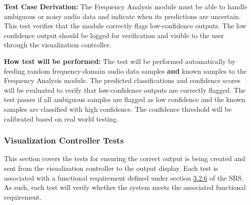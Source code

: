 \documentclass[12pt, titlepage]{article}
\begin{document}
\begin{enumerate}
\textbf{Test Case Derivation:}
The Frequency Analysis module must be able to handle ambiguous or noisy audio
data and indicate when its predictions are uncertain. This test verifies that
the module correctly flags low-confidence outputs. The low confidence output
should be logged for verification and visible to the user through the
visualization controller.

\textbf{How test will be performed:}
The test will be performed automatically by feeding random frequency-domain
audio data samples \textbf{and} known samples to the Frequency Analysis module.
The predicted classifications and confidence scores will be evaluated to verify
that low-confidence outputs are correctly flagged. The test passes if all
ambiguous samples are flagged as low confidence and the known samples are
classified with high confidence. The confidence threshold will be calibrated
based on real world testing. 

\end{enumerate}

\subsubsection{Visualization Controller Tests}

This section covers the tests for ensuring the correct output is being created
and sent from the visualization controller to the output display. Each test is
associated with a functional requirement defined under section
\hyperref[SRS-sec:FR6]{3.2.6} of the SRS. As such, each test will verify whether
the system meets the associated functional requirement. 
\end{document}
